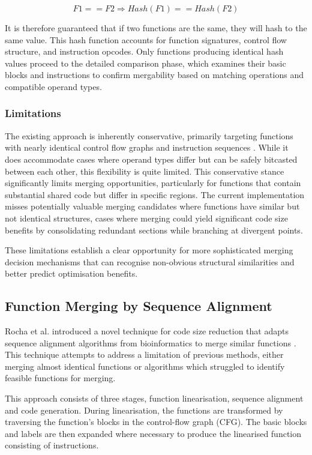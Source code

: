 \begin{equation}
F1 == F2 \Rightarrow Hash(F1) == Hash(F2)
\end{equation}

It is therefore guaranteed that if two functions are the same, they will hash to the same value. This hash function accounts for function signatures, control flow structure, and instruction opcodes. Only functions producing identical hash values proceed to the detailed comparison phase, which examines their basic blocks and instructions to confirm mergability based on matching operations and compatible operand types.

\subsubsection{Limitations}
The existing approach is inherently conservative, primarily targeting functions with nearly identical control flow graphs and instruction sequences \cite{LLVMMergeFunctionsPass}. While it does accommodate cases where operand types differ but can be safely bitcasted between each other, this flexibility is quite limited. This conservative stance significantly limits merging opportunities, particularly for functions that contain substantial shared code but differ in specific regions. The current implementation misses potentially valuable merging candidates where functions have similar but not identical structures, cases where merging could yield significant code size benefits by consolidating redundant sections while branching at divergent points.

These limitations establish a clear opportunity for more sophisticated merging decision mechanisms that can recognise non-obvious structural similarities and better predict optimisation benefits.

\subsection{Function Merging by Sequence Alignment}
Rocha et al. introduced a novel technique for code size reduction that adapts sequence alignment algorithms from bioinformatics to merge similar functions \cite{FunctionMergingSequenceAlignment}. This technique attempts to address a limitation of previous methods, either merging almost identical functions or algorithms which struggled to identify feasible functions for merging.

This approach consists of three stages, function linearisation, sequence alignment and code generation. During linearisation, the functions are transformed by traversing the function's blocks in the control-flow graph (CFG). The basic blocks and labels are then expanded where necessary to produce the linearised function consisting of instructions. 


